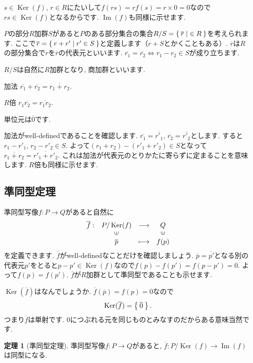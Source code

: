 \documentclass{jsarticle}
\newcommand{\makeop}[1]{\mathop{\mathrm{#1}}\nolimits}
\def\Im{\makeop{Im}}
\def\Ker{\makeop{Ker}}
\theoremstyle{definition}
\newtheorem{theorem}{定理}
\newcommand{\mydescription}[1]{
\begin{description}
\setlength{\itemindent}{2zw}
\setlength{\leftskip}{-2zw}
\setlength{\labelsep}{1zw}
#1
\end{description}
}
\numberwithin{theorem}{section}
\begin{document}
$s \in \Ker(f)$, $r \in R$にたいして$f(rs)=rf(s)=r\times 0=0$なので$rs \in \Ker(f)$となるからです. $\Im(f)$も同様に示せます.

$P$の部分$R$加群$S$があると$P$のある部分集合の集合$R/S=\Set{\overline{r}|\in R}$を考えられます.
ここで$\overline{r}=\Set{r+r'|r'\in S}$と定義します（$r+S$とかくこともある）. $\overline{r}$は$R$の部分集合で$r$を$\overline{r}$の代表元といいます.
$\overline{r_1}=\overline{r_2} \iff r_1-r_2 \in S$が成り立ちます.

$R/S$は自然に$R$加群となり, 商加群といいます.
\mydescription{
\item[加法] $\overline{r_1}+\overline{r_2}=\overline{r_1+r_2}$.
\item[$R$倍] $r_1\overline{r_2}=\overline{r_1 r_2}$.
}
単位元は$\overline{0}$です.

加法がwell-definedであることを確認します.
$\overline{r_1}=\overline{r'_1}$, $\overline{r_2}=\overline{r'_2}$とします.
すると$r_1-r'_1$, $r_2-r'_2 \in S$. よって$(r_1+r_2)-(r'_1+r'_2) \in S$となって$\overline{r_1+r_2}=\overline{r'_1+r'_2}$.
これは加法が代表元のとりかたに寄らずに定まることを意味します. $R$倍も同様に示せます.

\subsection{準同型定理}

準同型写像$f: P \rightarrow Q$があると自然に
\[
\begin{array}{cccc}
\overline{f}:& P/\Ker(f)            & \longrightarrow & Q\\
        &\rotatebox{90}{$\in$} &                 & \rotatebox{90}{$\in$} \\
        & \overline{p}              & \longmapsto     & f(p)
\end{array}
\]
を定義できます. $\overline{f}$がwell-definedなことだけを確認しましょう.
$\overline{p}=\overline{p'}$となる別の代表元$p'$をとると$p-p'\in \Ker(f)$なので$f(p)-f(p')=f(p-p')=0$.
よって$f(p)=f(p')$. $\overline{f}$が$R$加群として準同型であることも示せます.

$\Ker(\overline{f})$はなんでしょうか. $\overline{f}(\overline{p})=f(p)=0$なので
\[
\Ker(\overline{f})=\Set{\overline{0}}.
\]
つまり$\overline{f}$は単射です. 0につぶれる元を同じものとみなすのだからある意味当然です.

\begin{theorem}[準同型定理]
準同型写像$f: P \rightarrow Q$があると, $\overline{f}:P/\Ker(f) \rightarrow \Im(f)$は同型になる.
\end{theorem}
\end{document}
